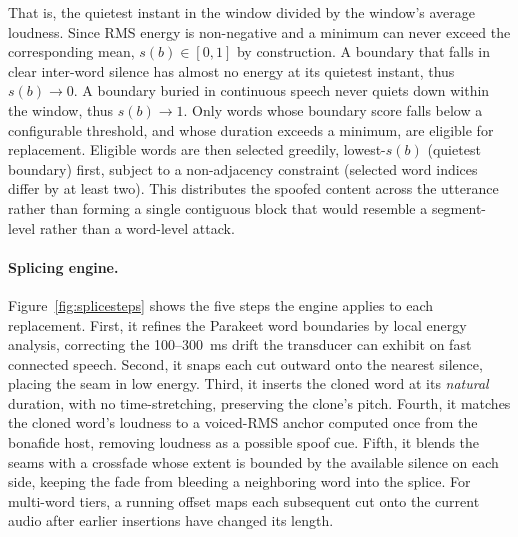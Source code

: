 \documentclass[11pt]{article}
\begin{document}
That is, the quietest instant in the window divided by the window's
average loudness. Since RMS energy is non-negative and a minimum can
never exceed the corresponding mean, $s(b) \in [0,1]$ by construction. A
boundary that falls in clear inter-word silence has almost no energy at
its quietest instant, thus $s(b) \to 0$. A boundary buried in continuous
speech never quiets down within the window, thus $s(b) \to 1$. Only
words whose boundary score falls below a configurable threshold, and
whose duration exceeds a minimum, are eligible for replacement. Eligible
words are then selected greedily, lowest-$s(b)$ (quietest boundary)
first, subject to a non-adjacency constraint (selected word indices
differ by at least two). This distributes the spoofed content across
the utterance rather than forming a single contiguous block that would
resemble a segment-level rather than a word-level attack.

\paragraph{Splicing engine.} Figure~\ref{fig:splicesteps} shows the five
steps the engine applies to each replacement. First, it refines the
Parakeet word boundaries by local energy analysis, correcting the
100--\SI{300}{\milli\second} drift the transducer can exhibit on fast
connected speech. Second, it snaps each cut outward onto the nearest
silence, placing the seam in low energy. Third, it inserts the cloned
word at its \emph{natural} duration, with no time-stretching, preserving
the clone's pitch. Fourth, it matches the cloned word's loudness to a
voiced-RMS anchor computed once from the bonafide host, removing loudness
as a possible spoof cue. Fifth, it blends the seams with a
crossfade whose extent is bounded by the available silence on each side,
keeping the fade from bleeding a neighboring word into the splice. For
multi-word tiers, a running offset maps each subsequent cut onto the
current audio after earlier insertions have changed its length.
\end{document}
